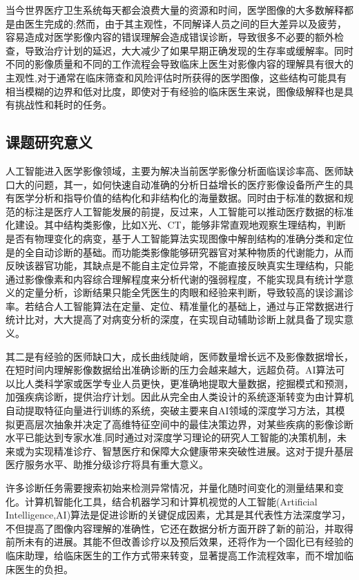 当今世界医疗卫生系统每天都会浪费大量的资源和时间，医学图像的大多数解释都是由医生完成的;然而，由于其主观性，不同解译人员之间的巨大差异以及疲劳，容易造成对医学影像内容的错误理解会造成错误诊断，导致很多不必要的额外检查，导致治疗计划的延迟，大大减少了如果早期正确发现的生存率或缓解率。同时不同的影像质量和不同的工作流程会导致临床上医生对影像内容的理解具有很大的主观性,对于通常在临床筛查和风险评估时所获得的医学图像，这些结构可能具有相当模糊的边界和低对比度，即使对于有经验的临床医生来说，图像级解释也是具有挑战性和耗时的任务。


\subsection{课题研究意义}

人工智能进入医学影像领域，主要为解决当前医学影像分析面临误诊率高、医师缺口大的问题，其一，如何快速自动准确的分析日益增长的医疗影像设备所产生的具有医学分析和指导价值的结构化和非结构化的海量数据。同时由于标准的数据和规范的标注是医疗人工智能发展的前提，反过来，人工智能可以推动医疗数据的标准化建设。其中结构类影像，比如X光、CT，能够非常直观地观察生理结构，判断是否有物理变化的病变，基于人工智能算法实现图像中解剖结构的准确分类和定位是的全自动诊断的基础。而功能类影像能够研究器官对某种物质的代谢能力，从而反映该器官功能，其缺点是不能自主定位异常，不能直接反映真实生理结构，只能通过影像像素和内容综合理解程度来分析代谢的强弱程度，不能实现具有统计学意义的定量分析，诊断结果只能全凭医生的肉眼和经验来判断，导致较高的误诊漏诊率。若结合人工智能算法在定量、定位、精准量化的基础上，通过与正常数据进行统计比对，大大提高了对病变分析的深度，在实现自动辅助诊断上就具备了现实意义。

其二是有经验的医师缺口大，成长曲线陡峭，医师数量增长远不及影像数据增长，在短时间内理解影像数据给出准确诊断的压力会越来越大，远超负荷。AI算法可以比人类科学家或医学专业人员更快，更准确地提取大量数据，挖掘模式和预测，加强疾病诊断，提供治疗计划。因此从完全由人类设计的系统逐渐转变为由计算机自动提取特征向量进行训练的系统，突破主要来自AI领域的深度学习方法，其模拟更高层次抽象并决定了高维特征空间中的最佳决策边界，对某些疾病的影像诊断水平已能达到专家水准,同时通过对深度学习理论的研究人工智能的决策机制，未来或为实现精准诊疗、智慧医疗和保障大众健康带来突破性进展。这对于提升基层医疗服务水平、助推分级诊疗将具有重大意义。

许多诊断任务需要搜索初始来检测异常情况，并量化随时间变化的测量结果和变化。计算机智能化工具，结合机器学习和计算机视觉的人工智能(Artificial Intelligence,AI)算法是促进诊断的关键促成因素，尤其是其代表性方法深度学习，不但提高了图像内容理解的准确性，它还在数据分析方面开辟了新的前沿，并取得前所未有的进展。其能不但改善诊疗以及预后效果，还将作为一个固化已有经验的临床助理，给临床医生的工作方式带来转变，显著提高工作流程效率，而不增加临床医生的负担。

